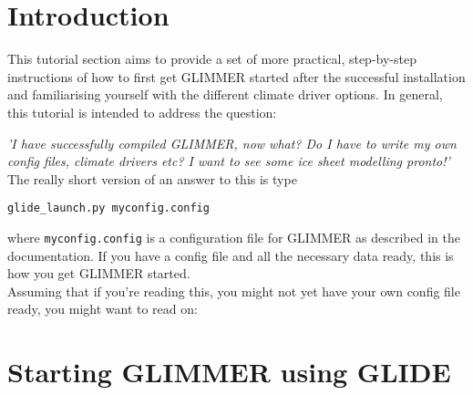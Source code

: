 \section{Introduction}
This tutorial section aims to provide a set of more practical, step-by-step
instructions of how to first get GLIMMER started after the successful
installation and familiarising yourself with the different climate driver
options. In general, this tutorial is intended to address the question:

\emph{'I have successfully compiled GLIMMER, now what? Do I have to write my
own config files, climate drivers etc? I want to see some ice sheet modelling
pronto!'}\\

The really short version of an answer to this is type
\begin{verbatim}
glide_launch.py myconfig.config
\end{verbatim}
where \texttt{myconfig.config} is a configuration file for GLIMMER as described
in the documentation. If you have a config file and all the necessary data
ready, this is how you get GLIMMER started. \\
Assuming that if you're reading this, you might not yet have your own config
file ready, you might want to read on:

\section{Starting GLIMMER using GLIDE}
